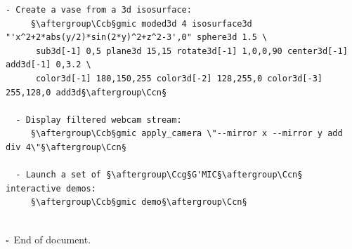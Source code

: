 \documentclass[a4paper,10.5pt,twoside]{book}
\def\Ccb{\color{cb}}
\def\Ccg{\color{cc}}
\def\Ccn{\color{black}}
\begin{document}
\begin{lstlisting}[escapechar=§]
  - Create a vase from a 3d isosurface: 
     §\aftergroup\Ccb§gmic moded3d 4 isosurface3d "'x^2+2*abs(y/2)*sin(2*y)^2+z^2-3',0" sphere3d 1.5 \
      sub3d[-1] 0,5 plane3d 15,15 rotate3d[-1] 1,0,0,90 center3d[-1] add3d[-1] 0,3.2 \
      color3d[-1] 180,150,255 color3d[-2] 128,255,0 color3d[-3] 255,128,0 add3d§\aftergroup\Ccn§ 
 
  - Display filtered webcam stream: 
     §\aftergroup\Ccb§gmic apply_camera \"--mirror x --mirror y add div 4\"§\aftergroup\Ccn§ 
 
  - Launch a set of §\aftergroup\Ccg§G'MIC§\aftergroup\Ccn§ interactive demos: 
     §\aftergroup\Ccb§gmic demo§\aftergroup\Ccn§ 

\end{lstlisting}
\normalsize
 
\printindex 
~\\$\square$~End of document. 
\end{document}
